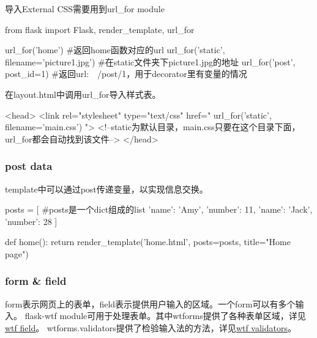       导入External CSS需要用到url\_for module
      \begin{codeblock}[language=python, caption={url\_for}]
        from flask import Flask, render_template, url_for

        url_for('home') #返回home函数对应的url
        url_for('static', filename='picture1.jpg') #在static文件夹下picture1.jpg的地址
        url_for('post', post_id=1) #返回url:~~/post/1，用于decorator里有变量的情况
      \end{codeblock}

      在layout.html中调用url\_for导入样式表。
      \begin{codeblock}[language=python, caption={layout.html}]
        <head>
            <link rel="stylesheet" type="text/css" 
                  href="{{ url_for('static', filename='main.css') }}">
            <!--static为默认目录，main.css只要在这个目录下面，url_for都会自动找到该文件-->
        </head>
      \end{codeblock}

    \subsubsection{post data}
      template中可以通过post传递变量，以实现信息交换。
      \begin{codeblock}[language=python, caption={post data in flask}]
        posts = [ #posts是一个dict组成的list
            {'name': 'Amy', 'number': 11},
            {'name': 'Jack', 'number': 28}
        ]

        def home():
            return render_template('home.html', posts=posts, title="Home page")
      \end{codeblock}


    \subsubsection{form \& field}
      form表示网页上的表单，field表示提供用户输入的区域。一个form可以有多个输入。
      flask-wtf module可用于处理表单。其中wtforms提供了各种表单区域，详见\href{https://wtforms.readthedocs.io/en/3.1.x/fields/}{\underline{wtf field}}。
      wtforms.validators提供了检验输入法的方法，详见\href{https://wtforms.readthedocs.io/en/3.1.x/validators/}{\underline{wtf validators}}。

